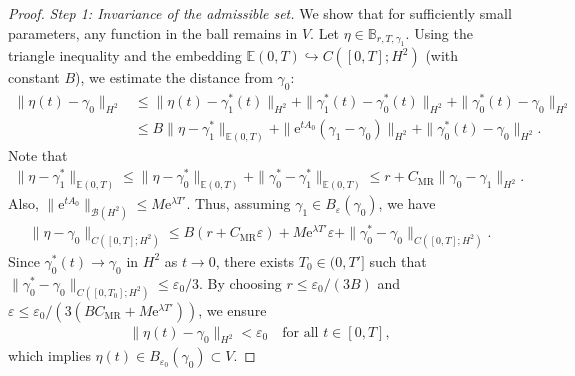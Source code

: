 \documentclass{article}
\theoremstyle{remark}
\theoremstyle{definition}
\numberwithin{equation}{section}
\begin{document}
\begin{proof}
    \textit{Step 1: Invariance of the admissible set.}
    We show that for sufficiently small parameters, any function in the ball remains in $V$.
    Let $\eta \in \mathbb{B}_{r,T,\gamma_1}$.
    Using the triangle inequality and the embedding $\mathbb{E}(0,T) \hookrightarrow C([0,T]; H^2)$ (with constant $B$), we estimate the distance from $\gamma_0$:
    \begin{align*}
        \|\eta(t) - \gamma_0\|_{H^2}
        &\le \|\eta(t) - \gamma_1^\ast(t)\|_{H^2} + \|\gamma_1^\ast(t) - \gamma_0^\ast(t)\|_{H^2} + \|\gamma_0^\ast(t) - \gamma_0\|_{H^2} \\
        &\le B \|\eta - \gamma_1^\ast\|_{\mathbb{E}(0,T)} + \|\mathrm{e}^{tA_0}(\gamma_1 - \gamma_0)\|_{H^2} + \|\gamma_0^\ast(t) - \gamma_0\|_{H^2}.
    \end{align*}
    Note that 
    \begin{align*}
        \|\eta - \gamma_1^\ast\|_{\mathbb{E}(0,T)} \le \|\eta - \gamma_0^\ast\|_{\mathbb{E}(0,T)} + \|\gamma_0^\ast - \gamma_1^\ast\|_{\mathbb{E}(0,T)} \le r + C_{\mathrm{MR}}\|\gamma_0 - \gamma_1\|_{H^2}.
    \end{align*}
    Also, $\|\mathrm{e}^{tA_0}\|_{\mathcal{B}(H^2)} \le M \mathrm{e}^{\lambda T'}$.
    Thus, assuming $\gamma_1 \in B_\varepsilon(\gamma_0)$, we have
    \begin{align}
        \|\eta - \gamma_0\|_{C([0,T];H^2)}
        \le B(r + C_{\mathrm{MR}}\varepsilon) + M \mathrm{e}^{\lambda T'} \varepsilon + \|\gamma_0^\ast - \gamma_0\|_{C([0,T];H^2)}.
        \label{eq:eta-gamma0_ineq}
    \end{align}
    Since $\gamma_0^\ast(t) \to \gamma_0$ in $H^2$ as $t \to 0$, there exists $T_0 \in (0, T']$ such that $\|\gamma_0^\ast - \gamma_0\|_{C([0,T_0];H^2)} \le \varepsilon_0/3$.
    By choosing $r \le \varepsilon_0/(3B)$ and $\varepsilon \le \varepsilon_0 / (3(BC_{\mathrm{MR}} + M\mathrm{e}^{\lambda T'}))$, we ensure
    \begin{align*}
        \|\eta(t) - \gamma_0\|_{H^2} < \varepsilon_0 \quad \text{for all } t \in [0, T],
    \end{align*}
    which implies $\eta(t) \in B_{\varepsilon_0}(\gamma_0) \subset V$.


\end{proof}
\end{document}
